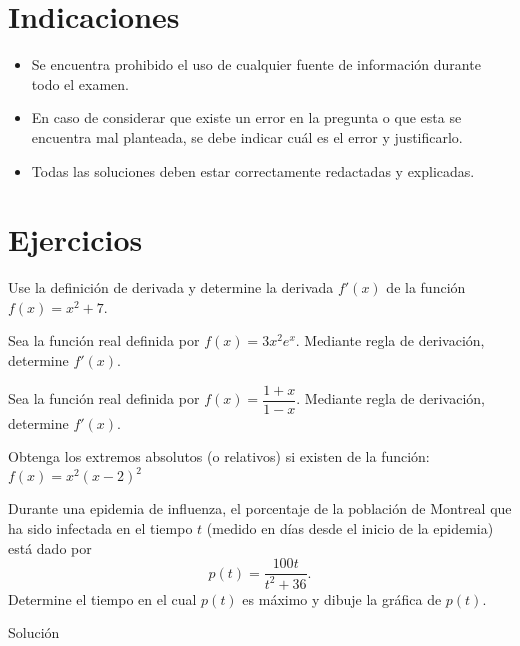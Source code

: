 \documentclass[11pt,a4]{aleph-examen}
\begin{document}
\encabezado

\section*{Indicaciones}
\begin{itemize}[leftmargin=*]
\item
    Se encuentra prohibido el uso de cualquier fuente de información durante todo el examen.
\item
    En caso de considerar que existe un error en la pregunta o que esta se encuentra mal planteada, se debe indicar cuál es el error y justificarlo.
\item
    Todas las soluciones deben estar correctamente redactadas y explicadas.
\end{itemize}

\section*{Ejercicios}

\begin{preguntas}

\item
    Use la definición de derivada y determine la derivada \( f'(x) \) de la función \( f(x) = x^2 + 7 \).
\item
    Sea la función real definida por \( f(x) = 3x^2e^x \). Mediante regla de derivación, determine \( f'(x) \).
\item
    Sea la función real definida por \( f(x) = \dfrac{1 + x}{1 - x} \). Mediante regla de derivación, determine \( f'(x) \).

\item
    Obtenga los extremos absolutos (o relativos) si existen de la función:
    \( f(x) = x^2 (x - 2)^2 \)

\item
    Durante una epidemia de influenza, el porcentaje de la población de Montreal que ha sido infectada en el tiempo \( t \) (medido en días desde el inicio de la epidemia) está dado por \[ p(t) = \dfrac{100t}{t^2 + 36}. \] Determine el tiempo en el cual \( p(t) \) es máximo y dibuje la gráfica de \( p(t) \).


\begin{respuesta}
    Solución
\end{respuesta}


\end{preguntas}
\end{document}
